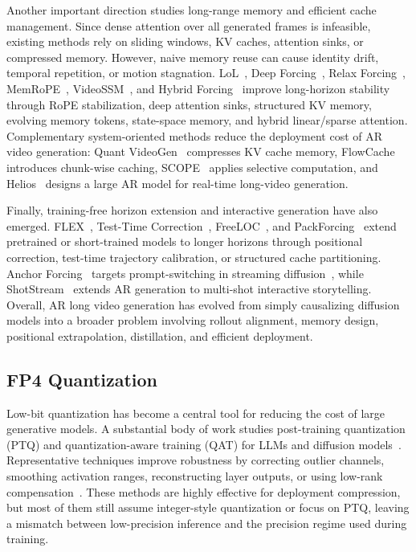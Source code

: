Another important direction studies long-range memory and efficient cache management.
Since dense attention over all generated frames is infeasible, existing methods rely on sliding windows, KV caches, attention sinks, or compressed memory.
However, naive memory reuse can cause identity drift, temporal repetition, or motion stagnation.
LoL~\cite{cui2026lol}, Deep Forcing~\cite{yi2025deep}, Relax Forcing~\cite{zhao2026relax}, MemRoPE~\cite{kim2026memrope}, VideoSSM~\cite{yu2025videossm}, and Hybrid Forcing~\cite{li2026hybrid} improve long-horizon stability through RoPE stabilization, deep attention sinks, structured KV memory, evolving memory tokens, state-space memory, and hybrid linear/sparse attention.
Complementary system-oriented methods reduce the deployment cost of AR video generation: Quant VideoGen~\cite{xi2026quant} compresses KV cache memory, FlowCache~\cite{ma2026flowcache} introduces chunk-wise caching, SCOPE~\cite{cui2026scope} applies selective computation, and Helios~\cite{yuan2026helios} designs a large AR model for real-time long-video generation.

Finally, training-free horizon extension and interactive generation have also emerged.
FLEX~\cite{li2026flex}, Test-Time Correction~\cite{xiang2026ttc}, FreeLOC~\cite{tian2026freeloc}, and PackForcing~\cite{mao2026packforcing} extend pretrained or short-trained models to longer horizons through positional correction, test-time trajectory calibration, or structured cache partitioning.
Anchor Forcing~\cite{yang2026anchor} targets prompt-switching in streaming diffusion~\cite{shotadapter}, while ShotStream~\cite{luo2026shotstream} extends AR generation to multi-shot interactive storytelling.
Overall, AR long video generation has evolved from simply causalizing diffusion models into a broader problem involving rollout alignment, memory design, positional extrapolation, distillation, and efficient deployment.

\subsection{FP4 Quantization}
Low-bit quantization has become a central tool for reducing the cost of large generative models. A substantial body of work studies post-training quantization (PTQ) and quantization-aware training (QAT) for LLMs and diffusion models~\cite{zandieh2025turboquant,li2024svdquant,zhao2024vidit}. Representative techniques improve robustness by correcting outlier channels, smoothing activation ranges, reconstructing layer outputs, or using low-rank compensation~\cite{frantar2022gptq,lin2024awq,xiao2023smoothquant,li2024svdquant,huang2024mixture,huang2026mc}. These methods are highly effective for deployment compression, but most of them still assume integer-style quantization or focus on PTQ, leaving a mismatch between low-precision inference and the precision regime used during training.

